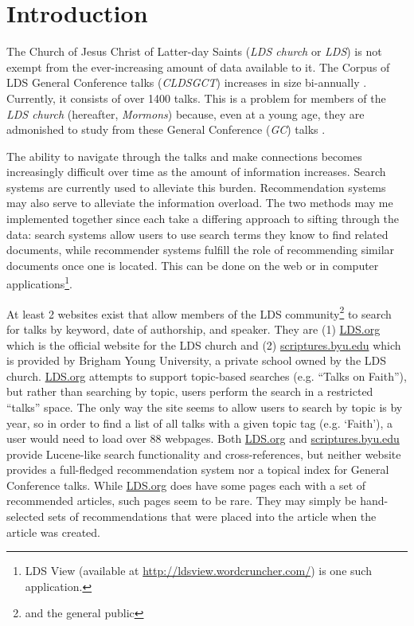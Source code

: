 \chapter{Introduction}

The Church of Jesus Christ of Latter-day Saints (\emph{LDS church} or \emph{LDS}) is not exempt from the ever-increasing amount of data available to it. The Corpus of LDS General Conference talks (\emph{CLDSGCT}) increases in size bi-annually \citep{davies:gc}. Currently, it consists of over 1400 talks. This is a problem for members of the \emph{LDS church} (hereafter, \emph{Mormons}) because, even at a young age, they are admonished to study from these General Conference (\emph{GC}) talks \citep{childrens_songbook}.

The ability to navigate through the talks and make connections becomes increasingly difficult over time as the amount of information increases. Search systems are currently used to alleviate this burden. Recommendation systems may also serve to alleviate the information overload. The two methods may me implemented together since each take a differing approach to sifting through the data: search systems allow users to use search terms they know to find related documents, while recommender systems fulfill the role of recommending similar documents once one is located. This can be done on the web or in computer applications\footnote{LDS View (available at \url{http://ldsview.wordcruncher.com/}) is one such application.}.

At least 2 websites exist that allow members of the LDS community\footnote{and the general public} to search for talks by keyword, date of authorship, and speaker. They are (1) \url{LDS.org} which is the official website for the LDS church and (2) \url{scriptures.byu.edu} which is provided by Brigham Young University, a private school owned by the LDS church. \url{LDS.org} attempts to support topic-based searches (e.g. ``Talks on Faith''), but rather than searching by topic, users perform the search in a restricted ``talks'' space. The only way the site seems to allow users to search by topic is by year, so in order to find a list of all talks with a given topic tag (e.g. `Faith'), a user would need to load over 88 webpages. Both \url{LDS.org} and \url{scriptures.byu.edu} provide Lucene-like search functionality \citep{McCandless:2010:LAS:1893016,lucene:luke} and cross-references, but neither website provides a full-fledged recommendation system nor a topical index for General Conference talks. While \url{LDS.org} does have some pages each with a set of recommended articles, such pages seem to be rare. They may simply be hand-selected sets of recommendations that were placed into the article when the article was created.

